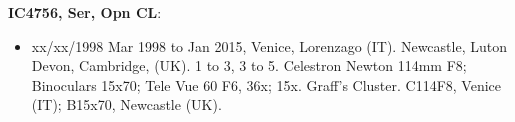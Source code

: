 {\bf IC4756, Ser, Opn CL}:
\begin{itemize}
\item xx/xx/1998 Mar 1998 to Jan 2015, Venice, Lorenzago (IT). Newcastle, Luton Devon, Cambridge, (UK). 1 to 3, 3 to 5. Celestron Newton 114mm F8; Binoculars 15x70; Tele Vue 60 F6, 36x; 15x. Graff's Cluster. C114F8, Venice (IT); B15x70, Newcastle (UK).
\end{itemize}
